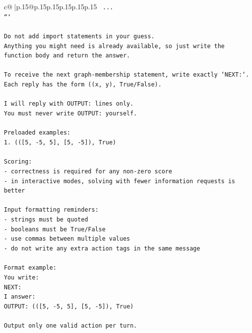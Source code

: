 \documentclass{article}
\begin{document}
{\begin{supertabular}{c@{$\;$}|p{.15\linewidth}@{}p{.15\linewidth}p{.15\linewidth}p{.15\linewidth}p{.15\linewidth}p{.15\linewidth}}
{{{\texttt{    ...} \\
\texttt{```} \\
\\ 
\texttt{Do not add import statements in your guess.} \\
\texttt{Anything you might need is already available, so just write the function body and return the answer.} \\
\\ 
\texttt{To receive the next graph{-}membership statement, write exactly `NEXT:`.} \\
\texttt{Each reply has the form ((x, y), True/False).} \\
\\ 
\texttt{I will reply with OUTPUT: lines only.} \\
\texttt{You must never write OUTPUT: yourself.} \\
\\ 
\texttt{Preloaded examples:} \\
\texttt{1. (({[}5, {-}5, 5{]}, {[}5, {-}5{]}), True)} \\
\\ 
\texttt{Scoring:} \\
\texttt{{-} correctness is required for any non{-}zero score} \\
\texttt{{-} in interactive modes, solving with fewer information requests is better} \\
\\ 
\texttt{Input formatting reminders:} \\
\texttt{{-} strings must be quoted} \\
\texttt{{-} booleans must be True/False} \\
\texttt{{-} use commas between multiple values} \\
\texttt{{-} do not write any extra action tags in the same message} \\
\\ 
\texttt{Format example:} \\
\texttt{You write:} \\
\texttt{NEXT:} \\
\texttt{I answer:} \\
\texttt{OUTPUT: (({[}5, {-}5, 5{]}, {[}5, {-}5{]}), True)} \\
\\ 
\texttt{Output only one valid action per turn.} \\
            }
        }
    }
     \\ \\


\end{supertabular}}
\end{document}
